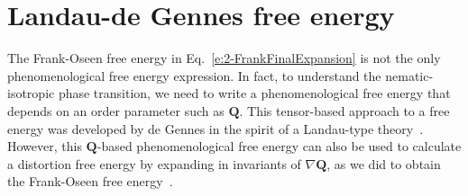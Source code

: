 \section{Landau-de Gennes free energy}
The Frank-Oseen free energy in Eq.~\ref{e:2-FrankFinalExpansion} is not the only phenomenological free energy expression.
In fact, to understand the nematic-isotropic phase transition, we need to write a phenomenological free energy that depends on an order parameter such as $\mathbf{Q}$.
This tensor-based approach to a free energy was developed by de Gennes in the spirit of a Landau-type theory~\cite{RN33}.
However, this $\mathbf{Q}$-based phenomenological free energy can also be used to calculate a distortion free energy by expanding in invariants of $\nabla \mathbf{Q}$, as we did to obtain the Frank-Oseen free energy~\cite{RN33,RN189,RN198}.


